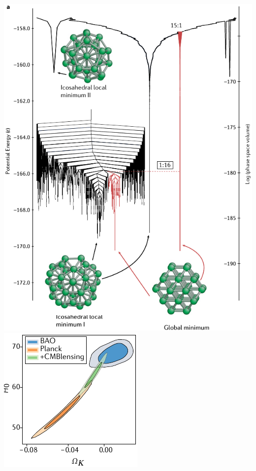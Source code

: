 \documentclass[aspectratio=169]{beamer}
\begin{document}
\begin{frame}
\begin{columns}
        \includegraphics[width=\textwidth]{figures/nature4}
        \includegraphics[width=\textwidth]{figures/nature5}
    \end{columns}

\end{frame}
\end{document}
